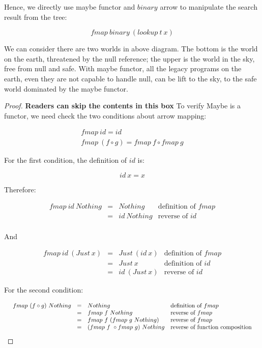 \documentclass[b5paper]{article}
\begin{document}
\begin{example}
Hence, we directly use maybe functor and $binary$ arrow to manipulate the search result from the tree:

\[
fmap\ binary\ (lookup\ t\ x)
\]

We can consider there are two worlds in above diagram. The bottom is the world on the earth, threatened by the null reference; the upper is the world in the sky, free from null and safe. With maybe functor, all the legacy programs on the earth, even they are not capable to handle null, can be lift to the sky, to the safe world dominated by the maybe functor.

\begin{mdframed}
\begin{proof}
\textbf{Readers can skip the contents in this box} To verify Maybe is a functor, we need check the two conditions about arrow mapping:

\[
\begin{array}{l}
fmap\ id = id \\
fmap\ (f \circ g) = fmap\ f \circ fmap\ g
\end{array}
\]

For the first condition, the definition of $id$ is:

\[
id\ x = x
\]

Therefore:

\[
\begin{array}{rcll}
fmap\ id\ Nothing & = & Nothing & \text{definition of $fmap$} \\
                  & = & id\ Nothing & \text{reverse of $id$} \\
\end{array}
\]

And

\[
\begin{array}{rcll}
fmap\ id\ (Just\ x) & = & Just\ (id\ x) & \text{definition of $fmap$} \\
                    & = & Just\ x & \text{definition of $id$} \\
                    & = & id\ (Just\ x) & \text{reverse of $id$}
\end{array}
\]

For the second condition:

\[
\resizebox{\textwidth}{!}{\ensuremath{
\begin{array}{rcll}
fmap\ (f \circ g)\ Nothing & = & Nothing & \text{definition of $fmap$} \\
           & = & fmap\ f\ Nothing & \text{reverse of $fmap$} \\
           & = & fmap\ f\ (fmap\ g\ Nothing) & \text{reverse of $fmap$} \\
           & = & (fmap\ f\ \circ fmap\ g)\ Nothing & \text{reverse of function composition}
\end{array}
}}
\]


\end{proof}
\end{mdframed}
\end{example}
\end{document}
